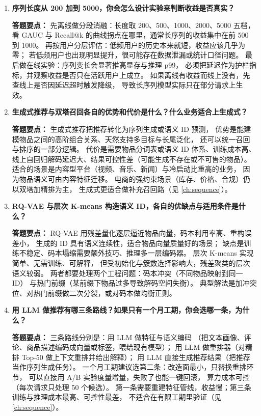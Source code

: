 \begin{interview}[题库与答题要点]
\begin{enumerate}[label=]
  \item[\textcolor{VioletDeep}{\textbf{Q24.}}] \textbf{序列长度从 200 加到 5000，你会怎么设计实验来判断收益是否真实？}
\par\smallskip\noindent\textcolor{VioletDeep}{\textbf{答题要点：}}
先离线做分段消融：长度取 200、500、1000、2000、5000 五档，
看 GAUC 与 Recall@k 的曲线拐点在哪里，通常长序列的收益集中在前 500 到 1000。
再按用户分层评估：低频用户的历史本来就短，收益应该几乎为零；
若低频用户也出现明显提升，很可能存在数据泄漏或统计口径问题。
最后做在线实验：序列变长会显著推高显存与推理 p99，
必须把延迟作为护栏指标，并观察收益是否只在活跃用户上成立。
如果离线有收益而线上没有，先查线上是否因延迟超时触发降级，
导致长序列模型实际只在部分请求上生效。

  \item[\textcolor{VioletDeep}{\textbf{Q25.}}] \textbf{生成式推荐与双塔召回各自的优势和代价是什么？什么业务适合上生成式？}
\par\smallskip\noindent\textcolor{VioletDeep}{\textbf{答题要点：}}
生成式推荐把推荐转化为序列生成或语义 ID 预测，
优势是能建模物品之间的高阶组合关系、天然支持多目标与长尾泛化，
还可以统一召回与排序的一部分逻辑。
代价是需要物品分词表或语义 ID 体系、训练成本高、
线上自回归解码延迟大、结果可控性差（可能生成不存在或不可售的物品）。
适合的场景是内容型平台（视频、音乐、新闻）与冷启动比重高的业务，
因为物品语义可由内容特征迁移。
电商的强约束场景（库存、价格、合规）仍以双塔加精排为主，
生成式更适合做补充召回路（见 \cref{ch:sequence}）。

  \item[\textcolor{VioletDeep}{\textbf{Q26.}}] \textbf{RQ-VAE 与层次 K-means 构造语义 ID，各自的优缺点与适用条件是什么？}
\par\smallskip\noindent\textcolor{VioletDeep}{\textbf{答题要点：}}
RQ-VAE 用残差量化逐层逼近物品向量，码本利用率高、重构误差小，
生成的 ID 具有语义连续性，适合物品向量质量好的场景；
缺点是训练不稳定、码本塌缩需要额外技巧、推理多一层编码器。
层次 K-means 实现简单、无需训练、可解释，
但受初始化与簇数选择影响大，残差聚类的层次语义较弱。
两者都要处理两个工程问题：码本冲突（不同物品映射到同一 ID）
与热门前缀（某前缀下物品过多导致解码空间失衡）。
典型解法是加冲突位、对热门前缀做二次分裂，或对码本做均衡正则。

  \item[\textcolor{VioletDeep}{\textbf{Q27.}}] \textbf{用 LLM 做推荐有哪三条路线？如果只有一个月工期，你会选哪一条，为什么？}
\par\smallskip\noindent\textcolor{VioletDeep}{\textbf{答题要点：}}
三条路线分别是：用 LLM 做特征与语义编码
（把文本画像、评论、商品描述编码成向量或标签，喂给现有模型）；
用 LLM 做重排器（对精排 Top-50 做上下文重排并给出解释）；
用 LLM 直接生成推荐结果（把推荐当作序列生成任务）。
一个月工期建议选第二条：改造面最小，只替换重排环节，
可以直接用 A/B 实验度量增量，失败了也能一键回滚，
算力成本可控（每次请求只处理 50 个候选）。
第一条需要重建特征管线，收益慢；第三条训练与推理成本最高、可控性最差，
不适合在有限工期里验证（见 \cref{ch:sequence}）。

\end{enumerate}

\end{interview}

